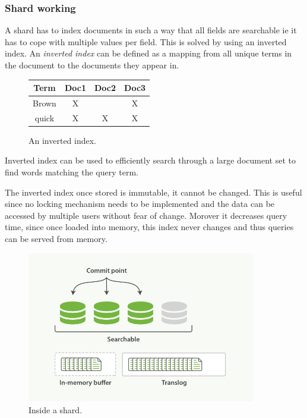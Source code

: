 \documentclass[12pt]{article}
\begin{document}
			\subsubsection{Shard working}
				A shard has to index documents in such a way that all fields are searchable ie it has to cope with multiple values per field. This is solved by using an inverted index. An \emph{inverted index} can be defined as a mapping from all unique terms in the document to the documents they appear in.
				\begin{figure}[ht]
				\begin{center}
				\begin{tabular}{|c|c|c|c|}
					\hline
					Term & Doc1 & Doc2 & Doc3\\
					\hline
					\hline
					Brown & X &  & X \\
					\hline
					quick & X & X & X \\
					\hline
				\end{tabular} 
				\caption{An inverted index.}
				\end{center}
				\end{figure}
				Inverted index can be used to efficiently search through a large document set to find words matching the query term.

				The inverted index once stored is immutable, it cannot be changed. This is useful since no locking mechanism needs to be implemented and the data can be accessed by multiple users without fear of change. Morover it decreases query time, since once loaded into memory, this index never changes and thus queries can be served from memory.

				\begin{figure}[ht]
					\centering\includegraphics[width=10cm]{images/inside_shard}
					\caption{Inside a shard.}
				\end{figure}
\end{document}
